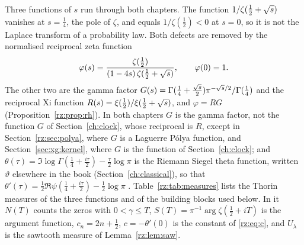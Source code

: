 Three functions of $s$ run through both chapters. The function $1/\zeta(\frac12+\sqrt{s})$ vanishes at $s=\frac14$, the pole of $\zeta$, and equals $1/\zeta(\frac12)<0$ at $s=0$, so it is not the Laplace transform of a probability law. Both defects are removed by the normalised reciprocal zeta function
\begin{equation}\label{rz:eq:phi}
\varphi(s)=\frac{\zeta(\frac12)}{(1-4s)\,\zeta(\frac12+\sqrt{s})},\qquad \varphi(0)=1 .
\end{equation}
The other two are the gamma factor $G(s)=\Gamma(\frac14+\frac{\sqrt{s}}2)\pi^{-\sqrt{s}/2}/\Gamma(\frac14)$ and the reciprocal Xi function $R(s)=\xi(\frac12)/\xi(\frac12+\sqrt{s})$, and $\varphi=RG$ (Proposition~\ref{rz:prop:rh}). In both chapters $G$ is the gamma factor, not the function $G$ of Section~\ref{ch:clock}, whose reciprocal is $R$, except in Section~\ref{rz:sec:polya}, where $G$ is a Laguerre P\'olya function, and Section~\ref{sec:xg:kernel}, where $G$ is the function of Section~\ref{ch:clock}; and $\theta(\tau)=\Im\log\Gamma(\frac14+\frac{i\tau}{2})-\frac\tau2\log\pi$ is the Riemann Siegel theta function, written $\vartheta$ elsewhere in the book (Section~\ref{ch:classical}), so that $\theta'(\tau)=\frac12\Re\psi(\frac14+\frac{i\tau}2)-\frac12\log\pi$ \cite[Section 6.5]{Edwards}. Table~\ref{rz:tab:measures} lists the Thorin measures of the three functions and of the building blocks used below. In it $N(T)$ counts the zeros with $0<\gamma\le T$, $S(T)=\pi^{-1}\arg\zeta(\frac12+iT)$ is the argument function, $c_n=2n+\frac12$, $c=-\theta'(0)$ is the constant of \eqref{rz:eq:c}, and $U_\lambda$ is the sawtooth measure of Lemma~\ref{rz:lem:saw}.

